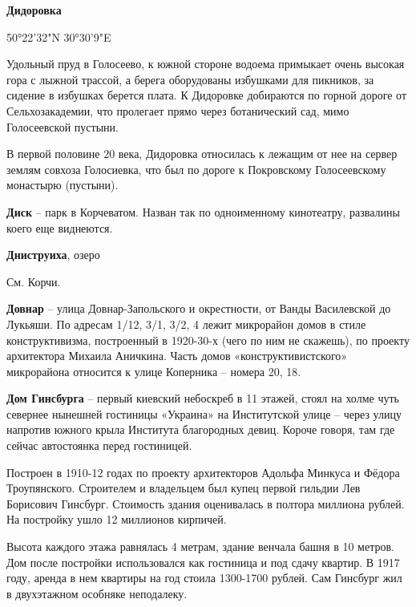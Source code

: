 \medskip

\textbf{Дидоровка}
 
50°22'32"N 30°30'9"E

Удольный пруд в Голосеево, к южной стороне водоема примыкает очень высокая гора с лыжной трассой, а берега оборудованы избушками для пикников, за сидение в избушках берется плата. К Дидоровке добираются по горной дороге от Сельхозакадемии, что пролегает прямо через ботанический сад, мимо Голосеевской пустыни.

В первой половине 20 века, Дидоровка относилась к лежащим от нее на сервер землям совхоза Голосиевка, что был по дороге к Покровскому Голосеевскому монастырю (пустыни).\\

\medskip

\textbf{Диск} – парк в Корчеватом. Назван так по одноименному кинотеатру, развалины коего еще виднеются.\\

\medskip

\textbf{Дниструиха}, озеро

См. Корчи.\\

\medskip

\textbf{Довнар} – улица Довнар-Запольского и окре\-стности, от Ванды Василевской до Лукьяши. По адресам 1/12, 3/1, 3/2, 4 лежит микрорайон домов в стиле конструктивизма, построенный в 1920-30-х (чего по ним не скажешь), по проекту архитектора Михаила Аничкина. Часть домов «конструктивистского» микрорайона относится к улице Коперника – номера 20, 18.\\

\medskip

\textbf{Дом Гинсбурга} – первый киевский небоскреб в 11 этажей, стоял на холме чуть севернее нынешней гостиницы «Украина» на Институтской улице – через улицу напротив южного крыла Института благородных девиц. Короче говоря, там где сейчас автостоянка перед гостиницей. 

Построен в 1910-12 годах по проекту архитекторов Адольфа Минкуса и Фёдора Троупянского. Строителем и владельцем был купец первой гильдии Лев Борисович Гинсбург. Стоимость здания оценивалась в полтора миллиона рублей. На постройку ушло 12 миллионов кирпичей. 

Высота каждого этажа равнялась 4 метрам, здание венчала башня в 10 метров. Дом после постройки использовался как гостиница и под сдачу квартир. В 1917 году, аренда в нем квартиры на год стоила 1300-1700 рублей. Сам Гинсбург жил в двухэтажном особняке неподалеку.

